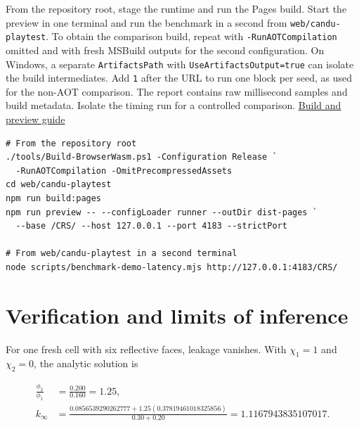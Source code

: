 \documentclass[11pt,letterpaper]{article}
\begin{document}
From the repository root, stage the runtime and run the Pages build. Start the preview
in one terminal and run the benchmark in a second from \texttt{web/candu-playtest}. To
obtain the comparison build, repeat with \texttt{-RunAOTCompilation} omitted and with
fresh MSBuild outputs for the second configuration. On Windows, a separate
\texttt{ArtifactsPath} with \texttt{UseArtifactsOutput=true} can isolate the build
intermediates. Add \texttt{1} after the URL to run one block per seed, as used for the
non-AOT comparison. The report contains raw millisecond samples and build metadata.
Isolate the timing run for a controlled comparison.
\href{https://github.com/hkkho/CRS/blob/4341ae8881f5827988c3d8b1859aa9e8f13cd8a6/docs/maintenance/hosting.md}{Build
and preview guide}

\begin{verbatim}
# From the repository root
./tools/Build-BrowserWasm.ps1 -Configuration Release `
  -RunAOTCompilation -OmitPrecompressedAssets
cd web/candu-playtest
npm run build:pages
npm run preview -- --configLoader runner --outDir dist-pages `
  --base /CRS/ --host 127.0.0.1 --port 4183 --strictPort

# From web/candu-playtest in a second terminal
node scripts/benchmark-demo-latency.mjs http://127.0.0.1:4183/CRS/
\end{verbatim}

\section{Verification and limits of
inference}\label{verification-and-limits-of-inference}

For one fresh cell with six reflective faces, leakage vanishes. With \(\chi_1=1\) and
\(\chi_2=0\), the analytic solution is

\begin{equation}
\label{eq:reflective-cell}
\begin{aligned}
\frac{\phi_2}{\phi_1} &= \frac{0.200}{0.160}=1.25,\\
k_\infty &= \frac{0.0856539290262777+1.25(0.37819461018325856)}
{0.30+0.20}=1.1167943835107017 .
\end{aligned}
\end{equation}
\end{document}
